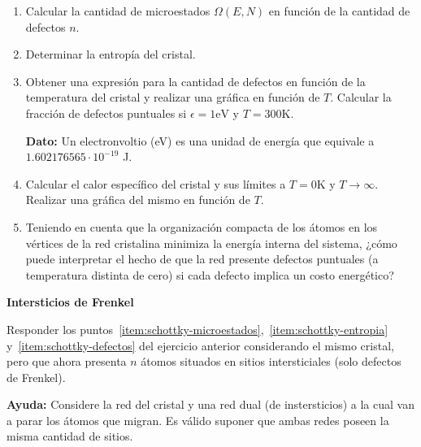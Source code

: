 \documentclass[a4paper,11pt]{article}
\begin{document}
\begin{enumerate}[label=(\alph*),
                  leftmargin=2\parindent,
                  rightmargin=2\parindent]

    \item{\label{item:schottky-microestados}
          Calcular la cantidad de microestados $\Omega(E, N)$ en
          función de la cantidad de defectos $n$.
          }

    \item{\label{item:schottky-entropia}
          Determinar la entropía del cristal.}

    \item{\label{item:schottky-defectos}
          Obtener una expresión para la cantidad de defectos en función de la
          temperatura del cristal y realizar una gráfica en función de $T$.
          Calcular la fracción de defectos puntuales si
          $\epsilon = 1 \text{eV}$ y $T = 300 \text{K}$.
          }

    {\small
    \textbf{Dato:}
    Un electronvoltio (eV) es una unidad de energía que equivale a
    $1.602176565 \cdot 10^{-19}$ J.
    }

    \item{\label{item:schottky-cv}
          Calcular el calor específico del cristal y sus límites
          a $T = 0 \text{K}$ y $T \rightarrow \infty$.
          Realizar una gráfica del mismo en función de $T$.
          }

    \item{Teniendo en cuenta que la organización compacta de los átomos
          en los vértices de la red cristalina minimiza la energía
          interna del sistema, ¿cómo puede interpretar el hecho de que
          la red presente defectos puntuales (a temperatura distinta de
          cero) si cada defecto implica un costo energético?
          }

\end{enumerate}


\textbf{Intersticios de Frenkel}
\vspace{0.5em}

Responder los puntos~\ref{item:schottky-microestados},~\ref{item:schottky-entropia}
y~\ref{item:schottky-defectos} del ejercicio anterior considerando el mismo cristal,
pero que ahora presenta $n$ átomos situados en sitios intersticiales (solo defectos de
Frenkel).

\vspace{0.5em}
{\small
\textbf{Ayuda:} Considere la red del cristal y una red dual (de
instersticios) a la cual van a parar los átomos que migran. Es válido
suponer que ambas redes poseen la misma cantidad de sitios.
}
\end{document}

